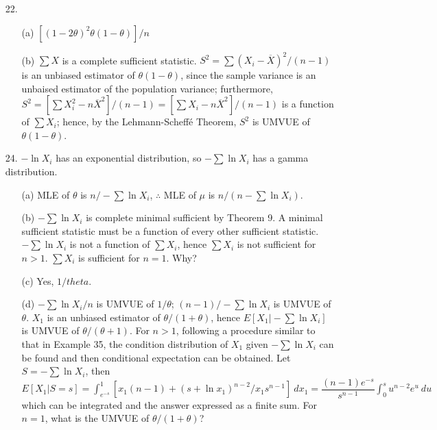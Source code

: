 \begin{enumerate}
	\item[22.] \begin{enumerate}
		\item[(a)] $[(1-2\theta)^2\theta(1-\theta)]/n$
		\item[(b)] $\sum X$ is a complete sufficient statistic. $S^2=\sum(X_i-\overline{X})^2/(n-1)$ is an unbiased estimator of $\theta(1-\theta)$, since the sample variance is an unbaised estimator of the population variance; furthermore, $S^2=[\sum X_i^2-n\overline{X}^2]/(n-1) = [\sum X_i -n\overline{X}^2]/(n-1)$ is a function of $\sum X_i$; hence, by the Lehmann-Scheff\'e Theorem, $S^2$ is UMVUE of $\theta(1-\theta)$.  
	\end{enumerate}	
	
	\item[24.] $-\ln X_i$ has an exponential distribution, so $-\sum \ln X_i$ has a gamma distribution.
	\begin{enumerate}
		\item[(a)] MLE of $\theta$ is $n/-\sum \ln X_i$, $\therefore$ MLE of $\mu$ is $n/(n-\sum \ln X_i)$.
		
		\newpage
		
		\item[(b)] $-\sum \ln X_i$ is complete minimal sufficient by Theorem 9.  A minimal sufficient statistic must be a function of every other sufficient statistic. $-\sum \ln X_i$ is not a function of $\sum X_i$, hence $\sum X_i$ is not sufficient for $n>1$. $\sum X_i$ is sufficient for $n=1$. Why?
		\item[(c)] Yes, $1/theta$.
		\item[(d)] $-\sum \ln X_i/n$ is UMVUE of $1/\theta$; $(n-1)/-\sum \ln X_i$ is UMVUE of $\theta$. $X_1$ is an unbiased estimator of $\theta/(1+\theta)$, hence $E[X_1 \vert -\sum \ln X_i]$ is UMVUE of $\theta/(\theta + 1)$. For $n>1$, following a procedure similar to that in Example 35, the condition distribution of $X_1$ given $-\sum \ln X_i$ can be found and then conditional expectation can be obtained. Let $S = -\sum \ln X_i$, then $E[X_1\vert S=s] = \displaystyle\int_{e^{-s}}^{1} [x_1(n-1) + (s+\ln x_1)^{n-2}/x_1s^{n-1}]\ dx_1 = \dfrac{(n-1)e^{-s}}{s^{n-1}}\int_0^s u^{n-2}e^u\ du$ which can be integrated and the answer expressed as a finite sum. For $n=1$, what is the UMVUE of $\theta/(1+\theta)$?
	\end{enumerate}
	

\end{enumerate}
